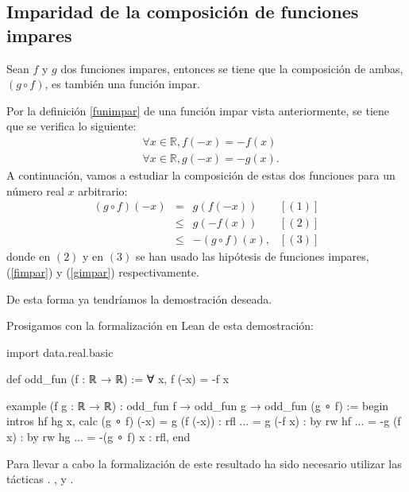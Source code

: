 \subsection{Imparidad de la composición de funciones impares}

\begin{teorema}
  Sean \(f\) y \(g\) dos funciones impares, entonces se tiene que la
  composición de ambas, \((g ∘ f)\), es también una función impar.
\end{teorema}

\begin{demostracion}
  Por la definición \ref{funimpar} de una función impar vista
  anteriormente, se tiene que se verifica lo siguiente:
  \begin{align}
    & ∀ x ∈ ℝ, f(-x) = -f(x)  \label{fimpar} \\
    & ∀ x ∈ ℝ, g(-x) = -g(x). \label{gimpar}
  \end{align}
  A continuación, vamos a estudiar la composición de estas dos funciones
  para un número real \(x\) arbitrario:
  \[\begin{array}{llll}
      (g ∘ f)(-x) &= &g(f(-x))     & [(1)]\\
                  &≤ &g(-f(x))     & [(2)] \\
                  &≤ &-(g ∘ f)(x), & [(3)]
    \end{array}\]
  donde en \((2)\) y en \((3)\) se han usado las hipótesis de funciones
  impares, (\ref{fimpar}) y (\ref{gimpar}) respectivamente.

  De esta forma ya tendríamos la demostración deseada.
\end{demostracion}

Prosigamos con la formalización en Lean de esta demostración:
\begin{leancode}
import data.real.basic

def odd_fun (f : ℝ → ℝ) := ∀ x, f (-x) = -f x

example
  (f g : ℝ → ℝ)
  : odd_fun f → odd_fun g →  odd_fun (g ∘ f) :=
begin
  intros hf hg x,
  calc (g ∘ f) (-x)
      =  g (f (-x)) : rfl
  ... =  g (-f x)   : by rw hf
  ... = -g (f x)    : by rw hg
  ... =  -(g ∘ f) x : rfl,
end
\end{leancode}

Para llevar a cabo la formalización de este resultado ha sido necesario utilizar
las tácticas
.
,
 y
.

